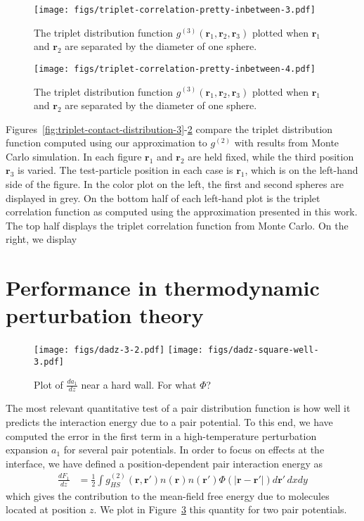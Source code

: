 \documentclass[letterpaper,twocolumn,amsmath,amssymb,pre,aps,10pt]{revtex4-1}
\newcommand{\rr}{\textbf{r}}
\begin{document}
\begin{figure}
  \texttt{[image: figs/triplet-correlation-pretty-inbetween-3.pdf]}
  \caption{The triplet distribution function
    $g^{(3)}(\rr_1,\rr_2,\rr_3)$ plotted when $\rr_1$ and $\rr_2$ are
    separated by the diameter of one sphere.}\label{fig:triplet-inbetween-distribution-3}
\end{figure}
\begin{figure}
  \texttt{[image: figs/triplet-correlation-pretty-inbetween-4.pdf]}
  \caption{The triplet distribution function
    $g^{(3)}(\rr_1,\rr_2,\rr_3)$ plotted when $\rr_1$ and $\rr_2$ are
    separated by the diameter of one sphere.}\label{fig:triplet-inbetween-distribution-4}
\end{figure}

Figures~\ref{fig:triplet-contact-distribution-3}-\ref{fig:triplet-inbetween-distribution-4}
compare the triplet distribution function computed using our
approximation to $g^{(2)}$ with results from Monte Carlo simulation.
In each figure $\rr_1$ and $\rr_2$ are held fixed, while the third
position $\rr_3$ is varied.  The test-particle position in each case
is $\rr_1$, which is on the left-hand side of the figure.  In the
color plot on the left, the first and second spheres are displayed in
grey.  On the bottom half of each left-hand plot is the triplet
correlation function as computed using the approximation presented in
this work.  The top half displays the triplet correlation function
from Monte Carlo.  On the right, we display 


\section{Performance in thermodynamic perturbation theory}

\begin{figure}
  \texttt{[image: figs/dadz-3-2.pdf]}
  \texttt{[image: figs/dadz-square-well-3.pdf]}
  \caption{Plot of $\frac{da_1}{dz}$ near a hard
    wall. For what $\Phi$?}\label{fig:dadz}
\end{figure}

The most relevant quantitative test of a pair distribution function is
how well it predicts the interaction energy due to a pair potential.
To this end, we have computed the error in the first term in a
high-temperature perturbation expansion $a_1$ for several pair
potentials.  In order to focus on effects at the interface, we have
defined a position-dependent pair interaction energy as
\begin{align}
  \frac{dF_1}{dz} &=
  \tfrac12 \int g^{(2)}_{HS}(\rr,\rr')n(\rr)n(\rr')\Phi(|\rr-\rr'|)
  d\rr'\, dxdy
\end{align}
which gives the contribution to the mean-field free energy due to
molecules located at position $z$.  We plot in Figure~\ref{fig:dadz}
this quantity for two pair potentials.
\end{document}
